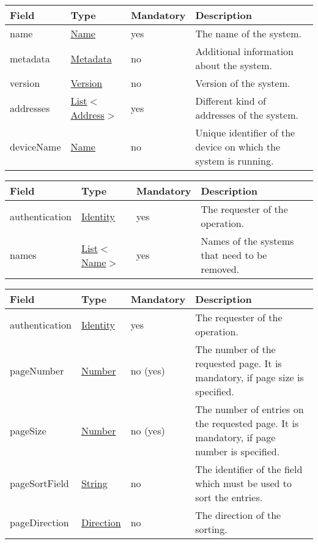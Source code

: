 \documentclass[a4paper]{arrowhead}
\newcommand{\pref}[1]{{\textcolor{ArrowheadGrey}{\hyperref[sec:model:primitives:#1]{#1}}}}
\begin{document}
 
\begin{table}[ht!]
\begin{tabularx}{\textwidth}{| p{2.5cm} | p{2.5cm} | p{2cm} | X |} \hline
\rowcolor{gray!33} Field & Type & Mandatory & Description \\ \hline
name & \pref{Name} & yes & The name of the system. \\ \hline
metadata &\hyperref[sec:model:Metadata]{Metadata} & no & Additional information about the system. \\ \hline
version &\pref{Version} & no & Version of the system. \\ \hline
addresses &  \pref{List}$<$\pref{Address}$>$ & yes & Different kind of addresses of the system.  \\ \hline
deviceName & \pref{Name} & no & Unique identifier of the device on which the system is running. \\ \hline
\end{tabularx}
\end{table}


\begin{table}[H]
\begin{tabularx}{\textwidth}{| p{2.5cm} | p{2.5cm} | p{2cm} | X |} \hline
\rowcolor{gray!33} Field & Type & Mandatory & Description \\ \hline
authentication & \hyperref[sec:model:Identity]{Identity} & yes & The requester of the operation. \\ \hline
names &  \pref{List}$<$\pref{Name}$>$ & yes & Names of the systems that need to be removed. \\ \hline
\end{tabularx}
\end{table}


\begin{table}[ht!]
\begin{tabularx}{\textwidth}{| p{2.5cm} | p{2.5cm} | p{2cm} | X |} \hline
\rowcolor{gray!33} Field & Type & Mandatory & Description \\ \hline
authentication & \hyperref[sec:model:Identity]{Identity} & yes & The requester of the operation. \\ \hline
pageNumber & \pref{Number} & no (yes) & The number of the requested page. It is mandatory, if page size is specified. \\ \hline
pageSize & \pref{Number} & no (yes) & The number of entries on the requested page. It is mandatory, if page number is specified. \\ \hline
pageSortField & \pref{String} & no & The identifier of the field which must be used to sort the entries. \\ \hline
pageDirection & \pref{Direction} & no & The direction of the sorting. \\ \hline
\end{tabularx}
\end{table}
\end{document}
